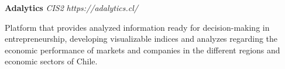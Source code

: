 \item
\headerrow
{\textbf{Adalytics}}
{\emph{}}
\headerrow
{\emph{CIS2}}
{\emph{https://adalytics.cl/}}
\begin{itemize*}
    \item Platform that provides analyzed information ready for decision-making in 
    entrepreneurship, developing visualizable indices and analyzes regarding 
    the economic performance of markets and companies in the different regions 
    and economic sectors of Chile.
\end{itemize*}